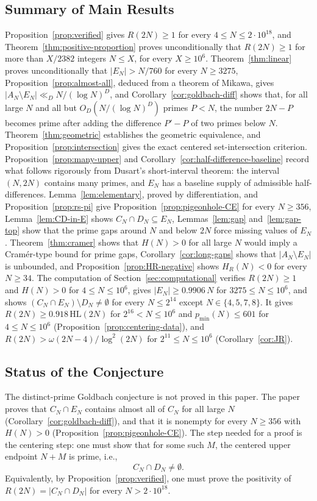 \documentclass[11pt]{amsart}
\theoremstyle{definition}
\theoremstyle{remark}
\begin{document}
\subsection*{Summary of Main Results}
Proposition~\ref{prop:verified} gives $R(2N)\geq 1$ for every $4\leq N\leq 2\cdot 10^{18}$, and Theorem~\ref{thm:positive-proportion} proves unconditionally that $R(2N)\geq 1$ for more than $X/2382$ integers $N\leq X$, for every $X\geq 10^6$. Theorem~\ref{thm:linear} proves unconditionally that $|E_N|>N/760$ for every $N\geq 3275$, Proposition~\ref{prop:almost-all}, deduced from a theorem of Mikawa, gives $|A_N\setminus E_N|\ll_D N/(\log N)^D$, and Corollary~\ref{cor:goldbach-diff} shows that, for all large $N$ and all but $O_D(N/(\log N)^D)$ primes $P<N$, the number $2N-P$ becomes prime after adding the difference $P'-P$ of two primes below $N$. Theorem~\ref{thm:geometric} establishes the geometric equivalence, and Proposition~\ref{prop:intersection} gives the exact centered set-intersection criterion. Proposition~\ref{prop:many-upper} and Corollary~\ref{cor:half-difference-baseline} record what follows rigorously from Dusart's short-interval theorem: the interval $(N,2N)$ contains many primes, and $E_N$ has a baseline supply of admissible half-differences. Lemma~\ref{lem:elementary}, proved by differentiation, and Proposition~\ref{prop:rs-pi} give Proposition~\ref{prop:pigeonhole-CE} for every $N\geq 356$, Lemma~\ref{lem:CD-in-E} shows $C_N\cap D_N\subseteq E_N$, Lemmas~\ref{lem:gap} and~\ref{lem:gap-top} show that the prime gaps around $N$ and below $2N$ force missing values of $E_N$. Theorem~\ref{thm:cramer} shows that $H(N)>0$ for all large $N$ would imply a Cram\'er-type bound for prime gaps, Corollary~\ref{cor:long-gaps} shows that $|A_N\setminus E_N|$ is unbounded, and Proposition~\ref{prop:HR-negative} shows $H_R(N)<0$ for every $N\geq 34$. The computation of Section~\ref{sec:computational} verifies $R(2N)\geq 1$ and $H(N)>0$ for $4\leq N\leq 10^6$, gives $|E_N|\geq 0.9906\,N$ for $3275\leq N\leq 10^6$, and shows $(C_N\cap E_N)\setminus D_N\neq\emptyset$ for every $N\leq 2^{14}$ except $N\in\{4,5,7,8\}$. It gives $R(2N)\geq 0.918\,\mathrm{HL}(2N)$ for $2^{16}<N\leq 10^6$ and $p_{\min}(N)\leq 601$ for $4\leq N\leq 10^6$ (Proposition~\ref{prop:centering-data}), and $R(2N)>\omega(2N-4)/\log^2(2N)$ for $2^{11}\leq N\leq 10^6$ (Corollary~\ref{cor:JR}).

\subsection*{Status of the Conjecture}
The distinct-prime Goldbach conjecture is not proved in this paper. The paper proves that $C_N\cap E_N$ contains almost all of $C_N$ for all large $N$ (Corollary~\ref{cor:goldbach-diff}), and that it is nonempty for every $N\geq 356$ with $H(N)>0$ (Proposition~\ref{prop:pigeonhole-CE}). The step needed for a proof is the centering step: one must show that for some such $M$, the centered upper endpoint $N+M$ is prime, i.e.,
\[
C_N\cap D_N\neq\emptyset.
\]
Equivalently, by Proposition~\ref{prop:verified}, one must prove the positivity of $R(2N)=|C_N\cap D_N|$ for every $N>2\cdot 10^{18}$.
\end{document}
